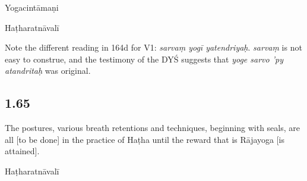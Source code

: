 \begin{ekdosis}
\begin{sources}[hp01_064]
\begin{versinnote}
\end{versinnote}

\end{sources}

\begin{testimonia}[hp01_064]
Yogacintāmaṇi

\begin{versinnote}
\end{versinnote}

Haṭharatnāvalī

\begin{versinnote}
\end{versinnote}

\end{testimonia}

\begin{philcomm}[hp01_064]
Note the different reading in 164d for V1: \emph{sarvaṃ yogī yatendriyaḥ}. \emph{sarvaṃ} is not easy to construe, and the testimony of the DYŚ suggests that \emph{yoge sarvo ’py atandritaḥ} was original.
\end{philcomm}

\subsection*{1.65}
\begin{translation}[hp01_065]
The postures, various breath retentions and techniques, beginning with seals, are all [to be done] in the practice of Haṭha until the reward that is Rājayoga [is attained].
\end{translation}

\begin{sources}[hp01_065]
\end{sources}

\begin{testimonia}[hp01_065]
Haṭharatnāvalī


\end{testimonia}
\end{ekdosis}
